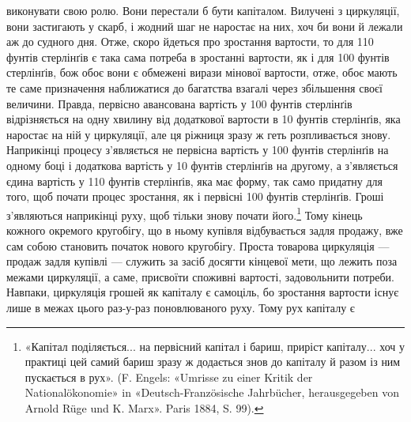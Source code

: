 \parcont{}  %
виконувати свою ролю. Вони перестали б бути капіталом. Вилучені
з циркуляції, вони застигають у скарб, і жодний шаг не наростає
на них, хоч би вони й лежали аж до судного дня. Отже,
скоро йдеться про зростання вартости, то для 110 фунтів стерлінґів
є така сама потреба в зростанні вартости, як і для 100 фунтів
стерлінґів, бож обоє вони є обмежені вирази мінової вартости,
отже, обоє мають те саме призначення наближатися до багатства
взагалі через збільшення своєї величини. Правда, первісно авансована
вартість у 100 фунтів стерлінґів відрізняється на одну хвилину
від додаткової вартости в 10 фунтів стерлінґів, яка наростає
на ній у циркуляції, але ця ріжниця зразу ж геть розпливається
знову. Наприкінці процесу з’являється не первісна вартість
у 100 фунтів стерлінґів на одному боці і додаткова вартість у
10 фунтів стерлінґів на другому, а з’являється єдина вартість у
110 фунтів стерлінґів, яка має форму, так само придатну для того,
щоб почати процес зростання, як і первісні 100 фунтів стерлінґів.
Гроші з’являються наприкінці руху, щоб тільки знову почати
його.\footnote{
«Капітал поділяється... на первісний капітал і бариш, приріст
капіталу... хоч у практиці цей самий бариш зразу ж додається знов до
капіталу й разом із ним пускається в рух». (F. Engels: «Umrisse zu
einer Kritik der Nationalökonomie» in «Deutsch-Französische Jahrbücher,
herausgegeben von Arnold Rüge und K. Marx». Paris 1884, S. 99).
} Тому кінець кожного окремого кругобігу, що в ньому
купівля відбувається задля продажу, вже сам собою становить
початок нового кругобігу. Проста товарова циркуляція — продаж
задля купівлі — служить за засіб досягти кінцевої мети,
що лежить поза межами циркуляції, а саме, присвоїти споживні
вартості, задовольнити потреби. Навпаки, циркуляція грошей
як капіталу є самоціль, бо зростання вартости існує лише в межах
цього раз-у-раз поновлюваного руху. Тому рух капіталу є
